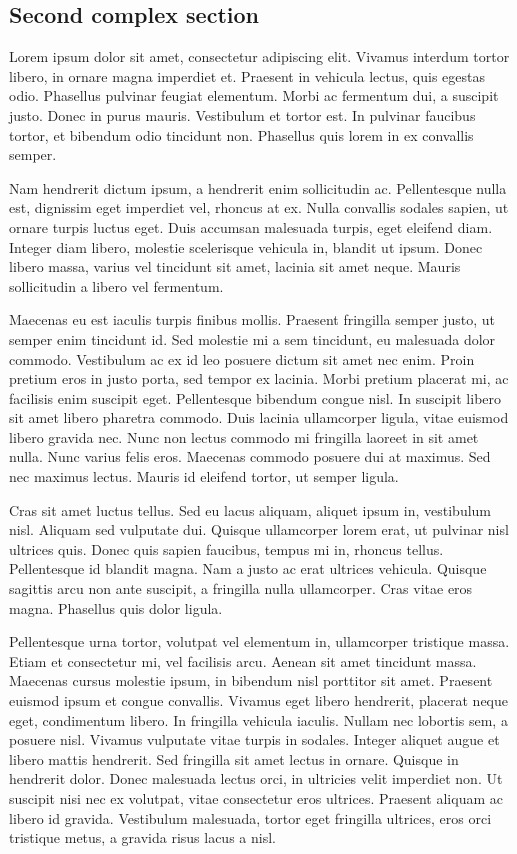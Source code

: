 
\subsection{\label{ch:sec:complex-sec2}Second complex section}


Lorem ipsum dolor sit amet, consectetur adipiscing elit. Vivamus interdum tortor libero, in ornare magna imperdiet et. Praesent in vehicula lectus, quis egestas odio. Phasellus pulvinar feugiat elementum. Morbi ac fermentum dui, a suscipit justo. Donec in purus mauris. Vestibulum et tortor est. In pulvinar faucibus tortor, et bibendum odio tincidunt non. Phasellus quis lorem in ex convallis semper.

Nam hendrerit dictum ipsum, a hendrerit enim sollicitudin ac. Pellentesque nulla est, dignissim eget imperdiet vel, rhoncus at ex. Nulla convallis sodales sapien, ut ornare turpis luctus eget. Duis accumsan malesuada turpis, eget eleifend diam. Integer diam libero, molestie scelerisque vehicula in, blandit ut ipsum. Donec libero massa, varius vel tincidunt sit amet, lacinia sit amet neque. Mauris sollicitudin a libero vel fermentum.

Maecenas eu est iaculis turpis finibus mollis. Praesent fringilla semper justo, ut semper enim tincidunt id. Sed molestie mi a sem tincidunt, eu malesuada dolor commodo. Vestibulum ac ex id leo posuere dictum sit amet nec enim. Proin pretium eros in justo porta, sed tempor ex lacinia. Morbi pretium placerat mi, ac facilisis enim suscipit eget. Pellentesque bibendum congue nisl. In suscipit libero sit amet libero pharetra commodo. Duis lacinia ullamcorper ligula, vitae euismod libero gravida nec. Nunc non lectus commodo mi fringilla laoreet in sit amet nulla. Nunc varius felis eros. Maecenas commodo posuere dui at maximus. Sed nec maximus lectus. Mauris id eleifend tortor, ut semper ligula.

Cras sit amet luctus tellus. Sed eu lacus aliquam, aliquet ipsum in, vestibulum nisl. Aliquam sed vulputate dui. Quisque ullamcorper lorem erat, ut pulvinar nisl ultrices quis. Donec quis sapien faucibus, tempus mi in, rhoncus tellus. Pellentesque id blandit magna. Nam a justo ac erat ultrices vehicula. Quisque sagittis arcu non ante suscipit, a fringilla nulla ullamcorper. Cras vitae eros magna. Phasellus quis dolor ligula.

Pellentesque urna tortor, volutpat vel elementum in, ullamcorper tristique massa. Etiam et consectetur mi, vel facilisis arcu. Aenean sit amet tincidunt massa. Maecenas cursus molestie ipsum, in bibendum nisl porttitor sit amet. Praesent euismod ipsum et congue convallis. Vivamus eget libero hendrerit, placerat neque eget, condimentum libero. In fringilla vehicula iaculis. Nullam nec lobortis sem, a posuere nisl. Vivamus vulputate vitae turpis in sodales. Integer aliquet augue et libero mattis hendrerit. Sed fringilla sit amet lectus in ornare. Quisque in hendrerit dolor. Donec malesuada lectus orci, in ultricies velit imperdiet non. Ut suscipit nisi nec ex volutpat, vitae consectetur eros ultrices. Praesent aliquam ac libero id gravida. Vestibulum malesuada, tortor eget fringilla ultrices, eros orci tristique metus, a gravida risus lacus a nisl. 

